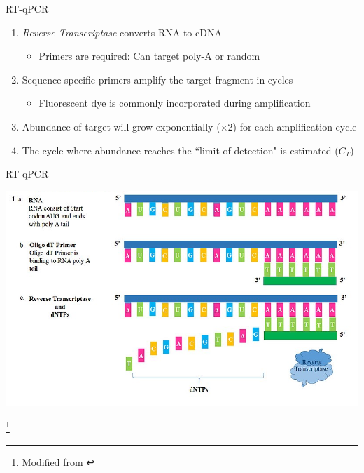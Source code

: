 \documentclass[aspectratio=169,11pt]{beamer}
\newcommand\blfootnote[1]{%
  \begingroup
  \renewcommand\thefootnote{}\footnote{#1}%
  \addtocounter{footnote}{-1}%
  \endgroup
}
\begin{document}
\begin{frame}{RT-qPCR}

	\begin{enumerate}
		\item \textit{Reverse Transcriptase} converts RNA to cDNA
		\begin{itemize}
			\item Primers are required: Can target poly-A or random
		\end{itemize}
		\item Sequence-specific primers amplify the target fragment in cycles
		\begin{itemize}
			\item Fluorescent dye is commonly incorporated during amplification
		\end{itemize}
		\item Abundance of target will grow exponentially ($\times 2$) for each amplification cycle
		\item The cycle where abundance reaches the ``limit of detection" is estimated ($C_T$)
	\end{enumerate}

\end{frame}

\begin{frame}{RT-qPCR}

	\begin{center}
	\includegraphics[scale=0.3]{figures/RTqPCR1.png} 
	\end{center}
	
	\blfootnote{Modified from \cite{By Lokeshthimmana - Own work, CC BY-SA 4.0, https://commons.wikimedia.org/w/index.php?curid=76313637}}	

\end{frame}
\end{document}
